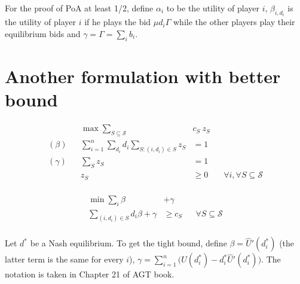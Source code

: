 \documentclass[11pt,a4paper]{article}
\begin{document}
For the proof of PoA at least 1/2, define $\alpha_{i}$ to be the utility of player $i$, $\beta_{i,d_{i}}$ is the utility of player $i$ if he plays 
the bid $\mu d_{i} \Gamma$ while the other players play their equilibrium bids and $\gamma = \Gamma = \sum_{i} b_{i}$. 

\section{Another formulation with better bound}

\begin{minipage}[t]{0.59\textwidth}
	\begin{align*}
		&& \max  \sum_{S \subseteq \mathcal{S}} &c_{S}\ z_{S} \\
		(\beta) && \sum_{i=1}^{n} \sum_{d_{i}} d_{i} \sum_{S: (i,d_{i}) \in S } z_{S} &= 1 & & \\
		(\gamma) && \sum_{S} z_{S}  &= 1	& & \\
		&& z_{S} &\geq 0 & & \forall i, \forall S \subseteq \mathcal{S}\\
	\end{align*}
\end{minipage}
\begin{minipage}[t]{0.3\textwidth}
	\begin{align*}
		\min \sum_{i} \beta &+ \gamma \\
		\sum_{(i,d_{i}) \in S} d_{i} \beta + \gamma &\geq c_{S}  & & \forall S \subseteq \mathcal{S}\\
\end{align*}
\end{minipage}

Let $d^{*}$ be a Nash equilibrium.  
To get the tight bound, define $\beta = \hat{U}'(d^{*}_{i})$ (the latter term is the same for every $i$), $\gamma = \sum_{i=1}^{n} \bigl( U(d^{*}_{i}) - d^{*}_{i}\hat{U}'(d^{*}_{i}) \bigr)$. 
The notation is taken in Chapter 21 of AGT book. 
\end{document}
